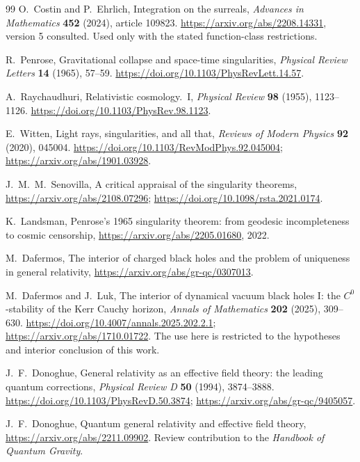 \documentclass[11pt,letterpaper]{article}
\numberwithin{equation}{section}
\theoremstyle{definition}
\theoremstyle{remark}
\begin{document}
\begin{thebibliography}{99}
O.~Costin and P.~Ehrlich, Integration on the surreals, \emph{Advances in
Mathematics} \textbf{452} (2024), article 109823.
\url{https://arxiv.org/abs/2208.14331}, version 5 consulted. Used only with the
stated function-class restrictions.

R.~Penrose, Gravitational collapse and space-time singularities,
\emph{Physical Review Letters} \textbf{14} (1965), 57--59.
\url{https://doi.org/10.1103/PhysRevLett.14.57}.

A.~Raychaudhuri, Relativistic cosmology.~I, \emph{Physical Review} \textbf{98}
(1955), 1123--1126. \url{https://doi.org/10.1103/PhysRev.98.1123}.

E.~Witten, Light rays, singularities, and all that, \emph{Reviews of Modern
Physics} \textbf{92} (2020), 045004.
\url{https://doi.org/10.1103/RevModPhys.92.045004};
\url{https://arxiv.org/abs/1901.03928}.

J.~M.~M.~Senovilla, A critical appraisal of the singularity theorems,
\url{https://arxiv.org/abs/2108.07296}; \url{https://doi.org/10.1098/rsta.2021.0174}.

K.~Landsman, Penrose's 1965 singularity theorem: from geodesic incompleteness
to cosmic censorship, \url{https://arxiv.org/abs/2205.01680}, 2022.

M.~Dafermos, The interior of charged black holes and the problem of uniqueness
in general relativity, \url{https://arxiv.org/abs/gr-qc/0307013}.

M.~Dafermos and J.~Luk, The interior of dynamical vacuum black holes I: the
$C^{0}$-stability of the Kerr Cauchy horizon, \emph{Annals of Mathematics}
\textbf{202} (2025), 309--630.
\url{https://doi.org/10.4007/annals.2025.202.2.1};
\url{https://arxiv.org/abs/1710.01722}. The use here is restricted to the
hypotheses and interior conclusion of this work.

J.~F.~Donoghue, General relativity as an effective field theory: the leading
quantum corrections, \emph{Physical Review D} \textbf{50} (1994), 3874--3888.
\url{https://doi.org/10.1103/PhysRevD.50.3874};
\url{https://arxiv.org/abs/gr-qc/9405057}.

J.~F.~Donoghue, Quantum general relativity and effective field theory,
\url{https://arxiv.org/abs/2211.09902}. Review contribution to the
\emph{Handbook of Quantum Gravity}.


\end{thebibliography}
\end{document}
